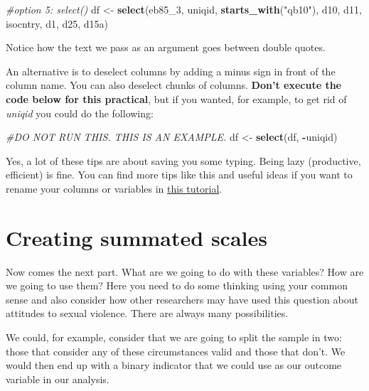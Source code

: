\documentclass[
]{book}
\newenvironment{Shaded}{\begin{snugshade}}{\end{snugshade}}
\newcommand{\CommentTok}[1]{\textcolor[rgb]{0.56,0.35,0.01}{\textit{#1}}}
\newcommand{\FunctionTok}[1]{\textcolor[rgb]{0.13,0.29,0.53}{\textbf{#1}}}
\newcommand{\NormalTok}[1]{#1}
\newcommand{\OtherTok}[1]{\textcolor[rgb]{0.56,0.35,0.01}{#1}}
\newcommand{\SpecialCharTok}[1]{\textcolor[rgb]{0.81,0.36,0.00}{\textbf{#1}}}
\newcommand{\StringTok}[1]{\textcolor[rgb]{0.31,0.60,0.02}{#1}}
\begin{document}
\begin{Shaded}
\begin{Highlighting}[]
\CommentTok{\#option 5: select()}
\NormalTok{df }\OtherTok{\textless{}{-}} \FunctionTok{select}\NormalTok{(eb85\_3, uniqid, }\FunctionTok{starts\_with}\NormalTok{(}\StringTok{"qb10"}\NormalTok{), d10, d11,}
\NormalTok{             isocntry, d1, d25, d15a)}
\end{Highlighting}
\end{Shaded}

Notice how the text we pass as an argument goes between double quotes.

An alternative is to deselect columns by adding a minus sign in front of the column name. You can also deselect chunks of columns. \textbf{Don't execute the code below for this practical}, but if you wanted, for example, to get rid of \emph{uniqid} you could do the following:

\begin{Shaded}
\begin{Highlighting}[]
\CommentTok{\#DO NOT RUN THIS. THIS IS AN EXAMPLE.}
\NormalTok{df }\OtherTok{\textless{}{-}} \FunctionTok{select}\NormalTok{(df, }\SpecialCharTok{{-}}\NormalTok{uniqid)}
\end{Highlighting}
\end{Shaded}

Yes, a lot of these tips are about saving you some typing. Being lazy (productive, efficient) is fine. You can find more tips like this and useful ideas if you want to rename your columns or variables in \href{https://suzan.rbind.io/2018/01/dplyr-tutorial-1/}{this tutorial}.

\section{Creating summated scales}\label{creating-summated-scales}

Now comes the next part. What are we going to do with these variables? How are we going to use them? Here you need to do some thinking using your common sense and also consider how other researchers may have used this question about attitudes to sexual violence. There are always many possibilities.

We could, for example, consider that we are going to split the sample in two: those that consider any of these circumstances valid and those that don't. We would then end up with a binary indicator that we could use as our outcome variable in our analysis.
\end{document}

